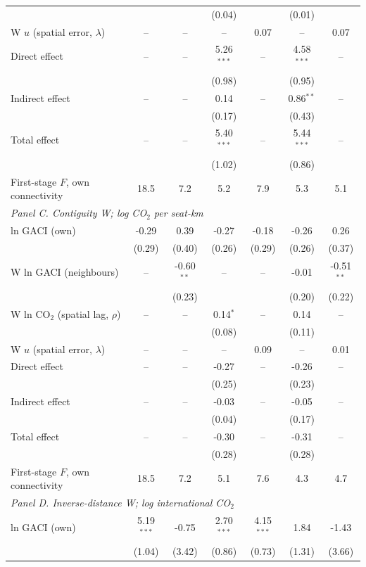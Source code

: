 \begin{table}[htbp]
\begin{threeparttable}
\begin{tabular}{lcccccc}
   &  &  & (0.04) &  & (0.01) &  \\
  W $u$ (spatial error, $\lambda$) & -- & -- & -- & 0.07 & -- & 0.07 \\
  Direct effect & -- & -- & 5.26$^{***}$ & -- & 4.58$^{***}$ & -- \\
   &  &  & (0.98) &  & (0.95) &  \\
  Indirect effect & -- & -- & 0.14 & -- & 0.86$^{**}$ & -- \\
   &  &  & (0.17) &  & (0.43) &  \\
  Total effect & -- & -- & 5.40$^{***}$ & -- & 5.44$^{***}$ & -- \\
   &  &  & (1.02) &  & (0.86) &  \\
  First-stage $F$, own connectivity & 18.5 & 7.2 & 5.2 & 7.9 & 5.3 & 5.1 \\
\midrule
\multicolumn{7}{l}{\textit{Panel C. Contiguity W; log CO$_2$ per seat-km}} \\
  ln GACI (own) & -0.29 & 0.39 & -0.27 & -0.18 & -0.26 & 0.26 \\
   & (0.29) & (0.40) & (0.26) & (0.29) & (0.26) & (0.37) \\
  W ln GACI (neighbours) & -- & -0.60$^{**}$ & -- & -- & -0.01 & -0.51$^{**}$ \\
   &  & (0.23) &  &  & (0.20) & (0.22) \\
  W ln CO$_2$ (spatial lag, $\rho$) & -- & -- & 0.14$^{*}$ & -- & 0.14 & -- \\
   &  &  & (0.08) &  & (0.11) &  \\
  W $u$ (spatial error, $\lambda$) & -- & -- & -- & 0.09 & -- & 0.01 \\
  Direct effect & -- & -- & -0.27 & -- & -0.26 & -- \\
   &  &  & (0.25) &  & (0.23) &  \\
  Indirect effect & -- & -- & -0.03 & -- & -0.05 & -- \\
   &  &  & (0.04) &  & (0.17) &  \\
  Total effect & -- & -- & -0.30 & -- & -0.31 & -- \\
   &  &  & (0.28) &  & (0.28) &  \\
  First-stage $F$, own connectivity & 18.5 & 7.2 & 5.1 & 7.6 & 4.3 & 4.7 \\
\midrule
\multicolumn{7}{l}{\textit{Panel D. Inverse-distance W; log international CO$_2$}} \\
  ln GACI (own) & 5.19$^{***}$ & -0.75 & 2.70$^{***}$ & 4.15$^{***}$ & 1.84 & -1.43 \\
   & (1.04) & (3.42) & (0.86) & (0.73) & (1.31) & (3.66) \\

\end{tabular}
\end{threeparttable}
\end{table}
